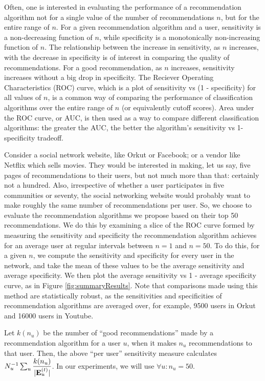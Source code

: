 \documentclass{sig-alternate}
\begin{document}
Often, one is interested in evaluating the performance of a recommendation algorithm not for a single value of the number of recommendations $n$, but for the entire range of $n$. For a given recommendation algorithm and a user, sensitivity is a non-decreasing function of $n$, while specificity is a monotonically non-increasing function of $n$. The relationship between the increase in sensitivity, as $n$ increases, with the decrease in specificity is of interest in comparing the quality of recommendations. For a good recommendation, as $n$ increases, sensitivity increases without a big drop in specificity. The Reciever Operating Characteristics (ROC) curve, which is a plot of sensitivity vs (1 - specificity) for all values of $n$, is a common way of comparing the performance of classification algorithms over the entire range of $n$ (or equivalently cutoff scores). Area under the ROC curve, or AUC, is then used as a way to compare different classification algorithms: the greater the AUC, the better the algorithm's sensitivity vs 1-specificity tradeoff.

Consider a social network website, like Orkut or Facebook; or a vendor like Netflix which sells movies. They would be interested in making, let us say, five pages of recommendations to their users, but not much more than that: certainly not a hundred. Also, irrespective of whether a user participates in five communities or seventy, the social networking website would probably want to make roughly the same number of recommendations per user. So, we choose to evaluate the recommendation algorithms we propose based on their top 50 recommendations. We do this by examining a slice of the ROC curve formed by measuring the sensitivity and specificity the recommendation algorithm achieves for an average user at regular intervals between $n = 1$ and $n = 50$. To do this, for a given $n$, we compute the sensitivity and specificity for every user in the network, and take the mean of these values to be the average sensitivity and average specificity. We then plot the average sensitivity vs 1 - average specificity curve, as in Figure \ref{fig:summaryResults}. Note that comparisons made using this method are statistically robust, as the sensitivities and specificities of recommendation algorithms are averaged over, for example, 9500 users in Orkut and 16000 users in Youtube.

Let $k(n_u)$ be the number of ``good recommendations'' made by a recommendation algorithm for a user $u$, when it makes $n_u$ recommendations to that user. Then, the above ``per user'' sensitivity measure calculates $N_u^{-1} \sum_u \displaystyle\frac{k(n_u) }{|\mathbf{E}_u^{(t)}|}$. In our experiments, we will use $\forall u: n_u = 50$.
\end{document}
